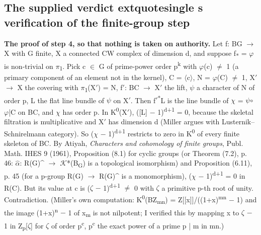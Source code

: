 \subsection*{The supplied verdict	extquotesingle s verification of the finite-group step}
\textbf{The proof of step 4, so that nothing is taken on authority.} Let f: BG \ensuremath{\to} X with G finite, X a connected CW complex of dimension d, and suppose f\textsubscript{*} = \ensuremath{\varphi} is non-trivial on \ensuremath{\pi}\textsubscript{1}. Pick c \ensuremath{\in} G of prime-power order p\textsuperscript{k} with \ensuremath{\varphi}(c) \ensuremath{\ne} 1 (a primary component of an element not in the kernel), C = \ensuremath{\langle}c\ensuremath{\rangle}, N = \ensuremath{\varphi}(C) \ensuremath{\ne} 1, X\ensuremath{\prime} \ensuremath{\to} X the covering with \ensuremath{\pi}\textsubscript{1}(X\ensuremath{\prime}) = N, f\ensuremath{\prime}: BC \ensuremath{\to} X\ensuremath{\prime} the lift, \ensuremath{\psi} a character of N of order p, L the flat line bundle of \ensuremath{\psi} on X\ensuremath{\prime}. Then f\ensuremath{\prime}\textsuperscript{*}L is the line bundle of \ensuremath{\chi} = \ensuremath{\psi}\ensuremath{\circ}\ensuremath{\varphi}|C on BC, and \ensuremath{\chi} has order p. In K\textsuperscript{0}(X\ensuremath{\prime}), ([L] \ensuremath{-} 1)\textsuperscript{d+1} = 0, because the skeletal filtration is multiplicative and X\ensuremath{\prime} has dimension d (Miller argues with Lusternik--Schnirelmann category). So (\ensuremath{\chi} \ensuremath{-} 1)\textsuperscript{d+1} restricts to zero in K\textsuperscript{0} of every finite skeleton of BC. By Atiyah, \emph{Characters and cohomology of finite groups}, Publ. Math. IHES 9 (1961), Proposition (8.1) for cyclic groups (or Theorem (7.2), p. 46: \ensuremath{\widehat{\alpha}}: R(G)\textasciicircum{} \ensuremath{\to} \ensuremath{\mathcal K}*(B\textsubscript{G}) is a topological isomorphism) and Proposition (6.11), p. 45 (for a p-group R(G) \ensuremath{\to} R(G)\textasciicircum{} is a monomorphism), (\ensuremath{\chi} \ensuremath{-} 1)\textsuperscript{d+1} = 0 in R(C). But its value at c is (\ensuremath{\zeta} \ensuremath{-} 1)\textsuperscript{d+1} \ensuremath{\ne} 0 with \ensuremath{\zeta} a primitive p-th root of unity. Contradiction. (Miller's own computation: K\textsuperscript{0}(BZ\textsubscript{mn}) = Z[[x]]/((1+x)\textsuperscript{mn} \ensuremath{-} 1) and the image (1+x)\textsuperscript{n} \ensuremath{-} 1 of x\textsubscript{m} is not nilpotent; I verified this by mapping x to \ensuremath{\zeta} \ensuremath{-} 1 in Z\textsubscript{p}[\ensuremath{\zeta}] for \ensuremath{\zeta} of order p\textsuperscript{c}, p\textsuperscript{c} the exact power of a prime p | m in mn.)



